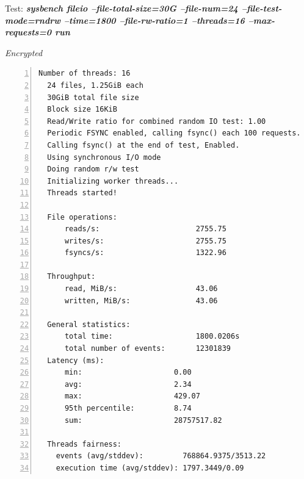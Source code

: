\newpage
\begin{center}
  Test: \textbf{\textit{sysbench fileio --file-total-size=30G --file-num=24 --file-test-mode=rndrw --time=1800 --file-rw-ratio=1 --threads=16 --max-requests=0 run}}  
\end{center}
\vspace*{-\baselineskip}
\noindent\begin{minipage}[t]{0.45\linewidth}
  \centering
  \textit{Encrypted}
  \begin{lstlisting}[basicstyle=\tiny,frame=single, numbers=left, label=cpu_test1]
  Number of threads: 16
  24 files, 1.25GiB each
  30GiB total file size
  Block size 16KiB
  Read/Write ratio for combined random IO test: 1.00
  Periodic FSYNC enabled, calling fsync() each 100 requests.
  Calling fsync() at the end of test, Enabled.
  Using synchronous I/O mode
  Doing random r/w test
  Initializing worker threads...
  Threads started!

  File operations:
      reads/s:                      2755.75
      writes/s:                     2755.75
      fsyncs/s:                     1322.96
  
  Throughput:
      read, MiB/s:                  43.06
      written, MiB/s:               43.06
  
  General statistics:
      total time:                   1800.0206s
      total number of events:       12301839
  Latency (ms):
      min:                     0.00
      avg:                     2.34
      max:                     429.07
      95th percentile:         8.74
      sum:                     28757517.82
  
  Threads fairness:
    events (avg/stddev):         768864.9375/3513.22
    execution time (avg/stddev): 1797.3449/0.09
  \end{lstlisting}
\end{minipage}
\hspace{0.5cm}
